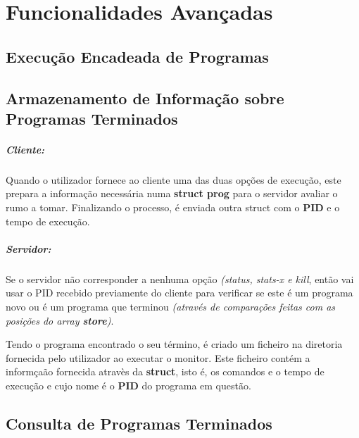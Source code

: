 \documentclass{report}
\begin{document}
\newpage

\section{Funcionalidades Avançadas}
\subsection{Execução Encadeada de Programas}
\subsection{Armazenamento de Informação sobre Programas Terminados}

\subparagraph{Cliente:} Quando o utilizador fornece ao cliente uma das duas opções de execução, este prepara a informação necessária numa \textbf{struct prog} para o servidor avaliar o rumo a tomar. Finalizando o processo, é enviada outra struct com o \textbf{PID} e o tempo de execução.

\subparagraph{Servidor:} Se o servidor não corresponder a nenhuma opção \textit{(status, stats-x e kill}, então vai usar o PID recebido previamente do cliente para verificar se este é um programa novo ou é um programa que terminou \textit{(através de comparações feitas com as posições do array \textbf{store})}.\par
Tendo o programa encontrado o seu término, é criado um ficheiro na diretoria fornecida pelo utilizador ao executar o monitor. Este ficheiro contém a informçaão fornecida atravès da \textbf{struct}, isto é, os comandos e o tempo de execução e cujo nome é o \textbf{PID} do programa em questão.
\subsection{Consulta de Programas Terminados}
\end{document}
